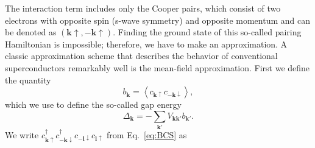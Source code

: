 The interaction term includes only the Cooper pairs, which consist of two electrons with opposite spin (s-wave symmetry) and opposite momentum and can be denoted as $(\bm{\bm{k}}\uparrow,-\bm{k}\uparrow)$.
Finding the ground state of this so-called pairing Hamiltonian is impossible; therefore, we have to make an approximation.
A classic approximation scheme that describes the behavior of conventional superconductors remarkably well is the mean-field approximation.
First we define the quantity
\[
b_{\bm{k}}=\left\langle c_{\bm{k}\uparrow}c_{-\bm{k}\downarrow}\right\rangle ,
\]
which we use to define the so-called gap energy
\[
\Delta_{\bm{k}}=-\sum_{\bm{k'}}V_{\bm{kk'}}b_{\bm{k'}}.
\]
We write $c_{\bm{k}\uparrow}^{\dagger}c_{-\bm{k}\downarrow}^{\dagger}c_{-\bm{l}\downarrow}c_{\bm{l}\uparrow}$ from Eq.~\ref{eq:BCS} as


